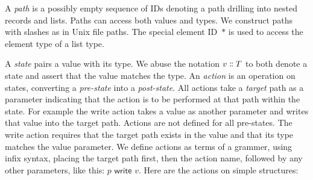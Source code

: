 \documentclass[english,submission]{programming}
\theoremstyle{definition}
\newcommand{\mathbox}[1]{\colorbox{black!10}{$#1$}}
\newcommand{\isa}{\dblcolon}
\begin{document}
A \textit{path} is a possibly empty sequence of IDs denoting a path drilling into nested records and lists. Paths can access both values and types. We construct paths with slashes as in Unix file paths. The special element ID~\mathbox{*} is used to access the element type of a list type.

A \textit{state} pairs a value with its type. We abuse the notation \mathbox{v \isa T} to both denote a state and assert that the value matches the type.
An \textit{action} is an operation on states, converting a \textit{pre-state} into a \textit{post-state}.
All actions take a \textit{target} path as a parameter indicating that the action is to be performed at that path within the state.
For example the \textsf{write} action takes a value as another parameter and writes that value into the target path. Actions are not defined for all pre-states. The \textsf{write} action requires that the target path exists in the value and that its type matches the value parameter. We define actions as terms of a grammer,
using infix syntax, placing the target path first, then the action name, followed by any other parameters, like this:
\mathbox{p \textsf{ write } v}. Here are the actions on simple structures:
\end{document}

